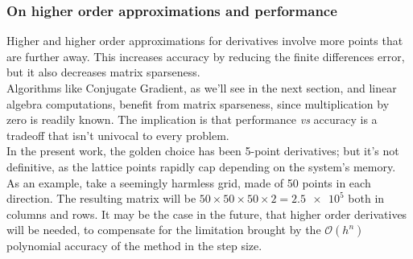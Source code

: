 \subsubsection{On higher order approximations and performance}
Higher and higher order approximations for derivatives involve more points that are further away. This increases accuracy by reducing the finite differences error, but it also decreases matrix sparseness.
\\Algorithms like Conjugate Gradient, as we'll see in the next section, and linear algebra computations, benefit from matrix sparseness, since multiplication by zero is readily known. The implication is that performance \textit{vs} accuracy is a tradeoff that isn't univocal to every problem.
\\In the present work, the golden choice has been 5-point derivatives; but it's not definitive, as the lattice points rapidly cap depending on the system's memory.
\\As an example, take a seemingly harmless grid, made of 50 points in each direction. The resulting matrix will be $50\times 50 \times 50 \times 2=\num{2.5e5}$ both in columns and rows. 
It may be the case in the future, that higher order derivatives will be needed, to compensate for the limitation brought by the $\mathcal O (h^n)$ polynomial accuracy of the method in the step size.